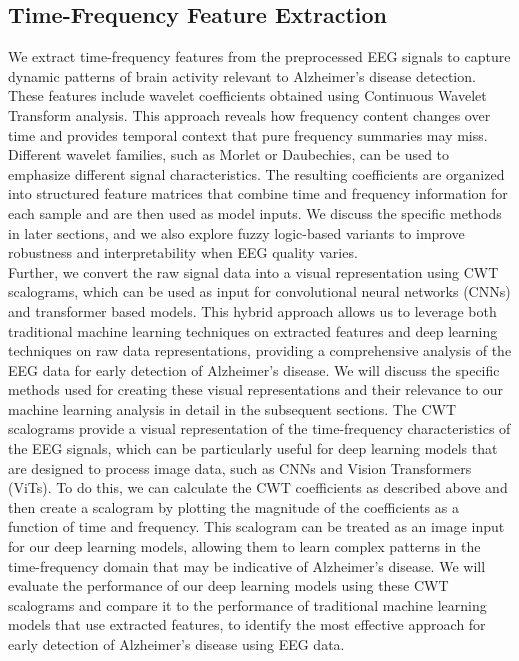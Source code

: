 \documentclass[openany]{book}
\begin{document}
\subsection{Time-Frequency Feature Extraction}
We extract time-frequency features from the preprocessed EEG signals to capture dynamic patterns of brain activity relevant to Alzheimer's disease detection. These features include wavelet coefficients obtained using Continuous Wavelet Transform analysis. This approach reveals how frequency content changes over time and provides temporal context that pure frequency summaries may miss. Different wavelet families, such as Morlet or Daubechies, can be used to emphasize different signal characteristics. The resulting coefficients are organized into structured feature matrices that combine time and frequency information for each sample and are then used as model inputs. We discuss the specific methods in later sections, and we also explore fuzzy logic-based variants to improve robustness and interpretability when EEG quality varies. \\
Further, we convert the raw signal data into a visual representation using CWT scalograms, which can be used as input for convolutional neural networks (CNNs) and transformer based models. This hybrid approach allows us to leverage both traditional machine learning techniques on extracted features and deep learning techniques on raw data representations, providing a comprehensive analysis of the EEG data for early detection of Alzheimer's disease. We will discuss the specific methods used for creating these visual representations and their relevance to our machine learning analysis in detail in the subsequent sections. The CWT scalograms provide a visual representation of the time-frequency characteristics of the EEG signals, which can be particularly useful for deep learning models that are designed to process image data, such as CNNs and Vision Transformers (ViTs). To do this, we can calculate the CWT coefficients as described above and then create a scalogram by plotting the magnitude of the coefficients as a function of time and frequency. This scalogram can be treated as an image input for our deep learning models, allowing them to learn complex patterns in the time-frequency domain that may be indicative of Alzheimer's disease. We will evaluate the performance of our deep learning models using these CWT scalograms and compare it to the performance of traditional machine learning models that use extracted features, to identify the most effective approach for early detection of Alzheimer's disease using EEG data.
\end{document}
